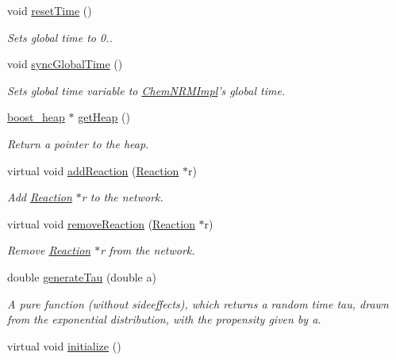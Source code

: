 \begin{DoxyCompactItemize}
void \hyperlink{classchem_1_1ChemNRMImpl_abc38c43b16a4ab1aa31505152e4426ed}{reset\-Time} ()
\begin{DoxyCompactList}\small\item\em Sets global time to 0.. \end{DoxyCompactList}\item 
void \hyperlink{classchem_1_1ChemNRMImpl_ad096a21196bb3e5a978dc3fdb50d8e1b}{sync\-Global\-Time} ()
\begin{DoxyCompactList}\small\item\em Sets global time variable to \hyperlink{classchem_1_1ChemNRMImpl}{Chem\-N\-R\-M\-Impl}'s global time. \end{DoxyCompactList}\item 
\hyperlink{namespacechem_aacd1d2bb93e0bb1b1af9bb1fbb5133ca}{boost\-\_\-heap} $\ast$ \hyperlink{classchem_1_1ChemNRMImpl_ae52572d35469dd8569457dbce96af78e}{get\-Heap} ()
\begin{DoxyCompactList}\small\item\em Return a pointer to the heap. \end{DoxyCompactList}\item 
virtual void \hyperlink{classchem_1_1ChemNRMImpl_a1b325b27b22f443f99fce659ae78aeee}{add\-Reaction} (\hyperlink{classchem_1_1Reaction}{Reaction} $\ast$r)
\begin{DoxyCompactList}\small\item\em Add \hyperlink{classchem_1_1Reaction}{Reaction} $\ast$r to the network. \end{DoxyCompactList}\item 
virtual void \hyperlink{classchem_1_1ChemNRMImpl_ad3a2b84f69c444a55b60d21200537338}{remove\-Reaction} (\hyperlink{classchem_1_1Reaction}{Reaction} $\ast$r)
\begin{DoxyCompactList}\small\item\em Remove \hyperlink{classchem_1_1Reaction}{Reaction} $\ast$r from the network. \end{DoxyCompactList}\item 
double \hyperlink{classchem_1_1ChemNRMImpl_a196f525d2e2392c0531f763fd8169701}{generate\-Tau} (double a)
\begin{DoxyCompactList}\small\item\em A pure function (without sideeffects), which returns a random time tau, drawn from the exponential distribution, with the propensity given by a. \end{DoxyCompactList}\item 
virtual void \hyperlink{classchem_1_1ChemNRMImpl_a685ac34bfa4b8226045bd3b8c6cdec95}{initialize} ()

\end{DoxyCompactItemize}
